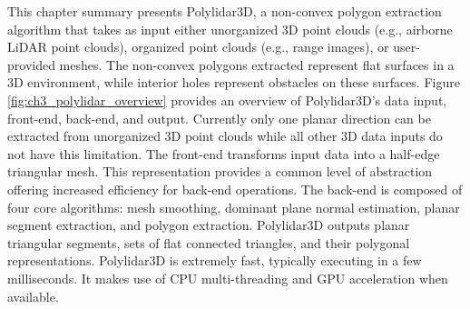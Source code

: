 This chapter summary presents Polylidar3D, a non-convex polygon extraction algorithm that takes as input either unorganized 3D point clouds (e.g., airborne LiDAR point clouds), organized point clouds (e.g., range images), or user-provided meshes. The non-convex polygons extracted represent flat surfaces in a 3D environment, while interior holes represent obstacles on these surfaces.  Figure \ref{fig:ch3_polylidar_overview} provides an overview of Polylidar3D's data input, front-end, back-end, and output. Currently only one planar direction can be extracted from unorganized 3D point clouds while all other 3D data inputs do not have this limitation. The front-end transforms input data into a half-edge triangular mesh.  This representation provides a common level of abstraction offering increased efficiency for back-end operations. The back-end is composed of four core algorithms: mesh smoothing, dominant plane normal estimation, planar segment extraction, and polygon extraction.  Polylidar3D outputs planar triangular segments, sets of flat connected triangles, and their polygonal representations. Polylidar3D is extremely fast, typically executing in a few milliseconds. It makes use of CPU multi-threading and GPU acceleration when available. 




